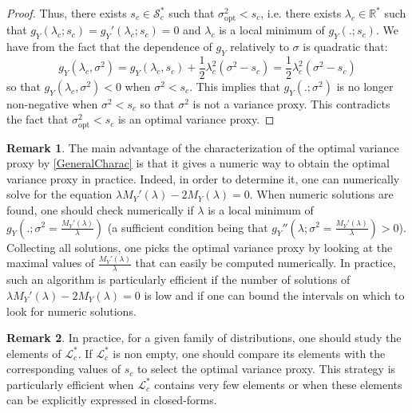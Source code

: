 \documentclass[a4paper, 10pt]{article}
\newcommand{\beq}{\begin{equation}}
\newcommand{\eeq}{\end{equation}}
\theoremstyle{definition}
\newtheorem{remark}{Remark}[section]
\begin{document}
\begin{proof}
\medskip

 Thus, there exists $s_c\in \mathcal{S}_c^*$ such that $\sigma_{\mathrm{opt}}^2<s_c$, i.e. there exists $\lambda_c\in \mathbb{R}^*$ such that $g_Y(\lambda_c;s_c)=g_Y'(\lambda_c;s_c)=0$ and $\lambda_c$ is a local minimum of $g_Y(.;s_c)$. We have from the fact that the dependence of $g_Y$ relatively to $\sigma$ is quadratic that:
\beq g_Y(\lambda_c,\sigma^2)=g_Y(\lambda_c,s_c) +\frac{1}{2}\lambda_c^2 (\sigma^2-s_c)=\frac{1}{2}\lambda_c^2 (\sigma^2-s_c)\eeq
so that $g_Y(\lambda_c,\sigma^2)<0$ when $\sigma^2<s_c$. This implies that $g_Y(.;\sigma^2)$ is no longer non-negative when $\sigma^2<s_c$ so that $\sigma^2$ is not a variance proxy. This contradicts the fact that $\sigma_{\mathrm{opt}}^2<s_c$ is an optimal variance proxy.
\end{proof}


\begin{remark}The main advantage of the characterization of the optimal variance proxy by \autoref{GeneralCharac} is that it gives a numeric way to obtain the optimal variance proxy in practice. Indeed, in order to determine it, one can numerically solve for the equation $\lambda M_Y'(\lambda)-2M_Y(\lambda)=0$. When numeric solutions are found, one should check numerically if $\lambda$ is a local minimum of $g_Y\left(.;\sigma^2=\frac{M_Y'(\lambda)}{\lambda}\right)$ (a sufficient condition being that $g_Y''\left(\lambda;\sigma^2=\frac{M_Y'(\lambda)}{\lambda}\right)>0$). Collecting all solutions, one picks the optimal variance proxy by looking at the maximal values of $\frac{M_Y'(\lambda)}{\lambda}$ that can easily be computed numerically. In practice, such an algorithm is particularly efficient if the number of solutions of $\lambda M_Y'(\lambda)-2M_Y(\lambda)=0$ is low and if one can bound the intervals on which to look for numeric solutions.  
\end{remark}


\begin{remark}
In practice, for a given family of distributions, one should study the elements of $\mathcal{L}_c^*$. If $\mathcal{L}_c^*$ is non empty, one should compare its elements with the corresponding values of $s_c$ to select the optimal variance proxy. This strategy is particularly efficient when $\mathcal{L}_c^*$ contains very few elements or when these elements can be explicitly expressed in closed-forms.
\end{remark}
\end{document}
